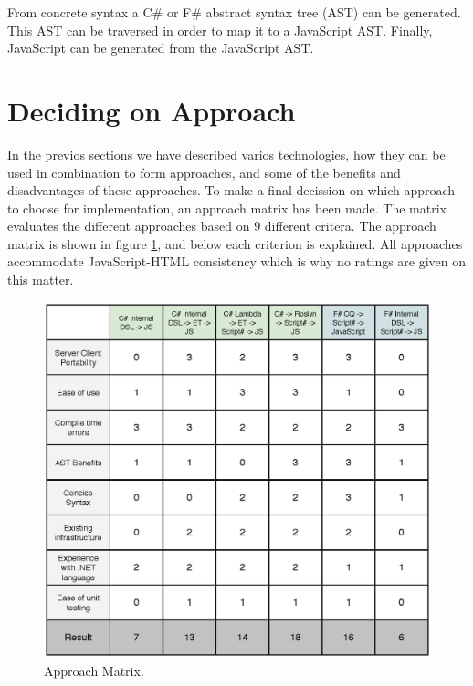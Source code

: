 	 From concrete syntax a C\# or F\# abstract syntax tree (AST) can be generated. This AST can be traversed in order to map it to a JavaScript AST. Finally, JavaScript can be generated from the JavaScript AST.



\section{Deciding on Approach} %
\label{sec:deciding_on_approach}
	In the previos sections we have described varios technologies, how they can be used in combination to form approaches, and some of the benefits and disadvantages of these approaches. To make a final decission on which approach to choose for implementation, an approach matrix has been made. The matrix evaluates the different approaches based on 9 different critera. The approach matrix is shown in figure \ref{approachMatrix}, and below each criterion is explained. All approaches accommodate JavaScript-HTML consistency which is why no ratings are given on this matter.

	\begin{figure}
		\begin{center}
			\centerline{\includegraphics[width=16cm]{resources/images/approachmatrix.eps}}
		\end{center}
		\caption{Approach Matrix.}
		\label{approachMatrix}
	\end{figure}

